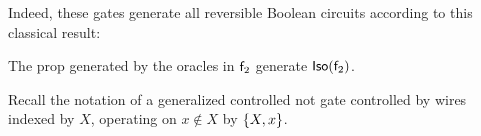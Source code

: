 Indeed, these gates generate all reversible Boolean circuits according to this classical result:

\begin{lemma}
The prop generated by the oracles in $\mathsf{f}_2$ generate ${\sf Iso}(\mathsf{f}_2)$.
\end{lemma}

%
%


Recall the notation of a generalized controlled not gate controlled by wires indexed by $X$, operating on $x\notin X$ by $\{ X,x\}$.



